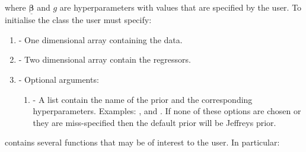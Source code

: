 \documentclass[article]{jss}
\begin{document}
where $\bm{\underline{\beta}}$ and $g$ are hyperparameters with values
that are specified by the user. To initialise the class
 the user must specify:
\begin{enumerate}
\item {} - One dimensional  array containing the
  data.
\item {} - Two dimensional  array contain the
  regressors.
\item {} - Optional arguments:

  \begin{enumerate}
  \item {} - A list contain the name of the prior and the
    corresponding hyperparameters. Examples: ,
     and . If none of these options are chosen or they are
    miss-specified then the default prior will be Jeffreys prior.
  \end{enumerate}
\end{enumerate}
 contains several functions that may be of
interest to the user. In particular:
\end{document}
